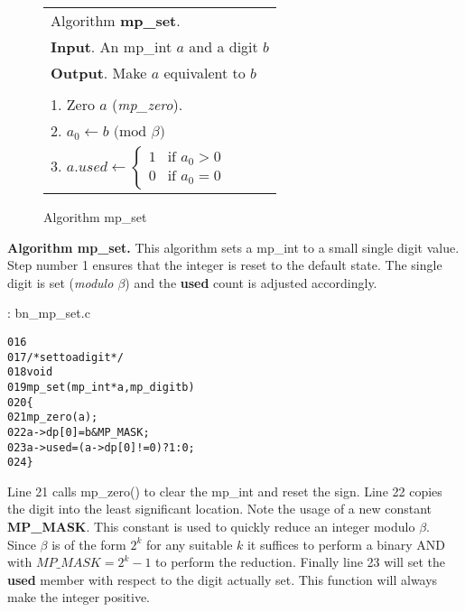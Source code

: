 \documentclass[b5paper]{book}
\begin{document}
\newpage\begin{figure}
\begin{center}
\begin{tabular}{l}
\hline Algorithm \textbf{mp\_set}. \\
\textbf{Input}.   An mp\_int $a$ and a digit $b$ \\
\textbf{Output}.  Make $a$ equivalent to $b$ \\
\hline \\
1.  Zero $a$ (\textit{mp\_zero}). \\
2.  $a_0 \leftarrow b \mbox{ (mod }\beta\mbox{)}$ \\
3.  $a.used \leftarrow  \left \lbrace \begin{array}{ll}
                              1 &  \mbox{if }a_0 > 0 \\
                              0 &  \mbox{if }a_0 = 0 
                              \end{array} \right .$ \\
\hline                              
\end{tabular}
\end{center}
\caption{Algorithm mp\_set}
\end{figure}

\textbf{Algorithm mp\_set.}
This algorithm sets a mp\_int to a small single digit value.  Step number 1 ensures that the integer is reset to the default state.  The
single digit is set (\textit{modulo $\beta$}) and the \textbf{used} count is adjusted accordingly.

\vspace{+3mm}\begin{small}
\hspace{-5.1mm}{\bf File}: bn\_mp\_set.c
\vspace{-3mm}
\begin{alltt}
016   
017   /* set to a digit */
018   void
019   mp_set (mp_int * a, mp_digit b)
020   \{
021     mp_zero (a);
022     a->dp[0] = b & MP_MASK;
023     a->used = (a->dp[0] != 0) ? 1 : 0;
024   \}
\end{alltt}
\end{small}

Line 21 calls mp\_zero() to clear the mp\_int and reset the sign.  Line 22 copies the digit 
into the least significant location.  Note the usage of a new constant \textbf{MP\_MASK}.  This constant is used to quickly
reduce an integer modulo $\beta$.  Since $\beta$ is of the form $2^k$ for any suitable $k$ it suffices to perform a binary AND with 
$MP\_MASK = 2^k - 1$ to perform the reduction.  Finally line 23 will set the \textbf{used} member with respect to the 
digit actually set. This function will always make the integer positive.
\end{document}

